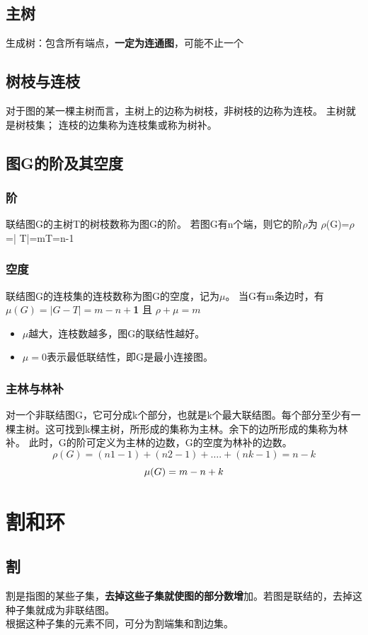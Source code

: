 \subsection{主树}
生成树：包含所有端点，\textbf{一定为连通图}，可能不止一个
\subsection{树枝与连枝}
对于图的某一棵主树而言，主树上的边称为树枝，非树枝的边称为连枝。
主树就是树枝集；
连枝的边集称为连枝集或称为树补。
\subsection{图G的阶及其空度
}
\subsubsection{阶}
联结图G的主树T的树枝数称为图G的阶。
若图G有n个端，则它的阶$ \rho $为
$ \rho $(G)=$ \rho$=| T|=mT=n-1
\subsubsection{空度}
联结图G的连枝集的连枝数称为图G的空度，记为$ \mu $。
当G有m条边时，有\textbf{$  \mu(G)=|G-T|=m-n+ $1} 且 $ \rho+\mu=m $
\begin{itemize}
	\item $ \mu $越大，连枝数越多，图G的联结性越好。
	\item $ \mu = 0 $表示最低联结性，即G是最小连接图。
\end{itemize}
\subsubsection{主林与林补}
对一个非联结图G，它可分成k个部分，也就是k个最大联结图。每个部分至少有一棵主树。这可找到k棵主树，所形成的集称为主林。余下的边所形成的集称为林补。
此时，G的阶可定义为主林的边数，G的空度为林补的边数。
\begin{equation}\label{key}
\rho(G)=(n1-1)+(n2-1)+….+(nk-1)=n-k 
\end{equation}
\begin{equation}\label{key}
\mu(G)=m-n+k \\
\end{equation}

\section{割和环}
\subsection{割}
割是指图的某些子集，\textbf{去掉这些子集就使图的部分数增}加。若图是联结的，去掉这种子集就成为非联结图。\\
根据这种子集的元素不同，可分为割端集和割边集。
